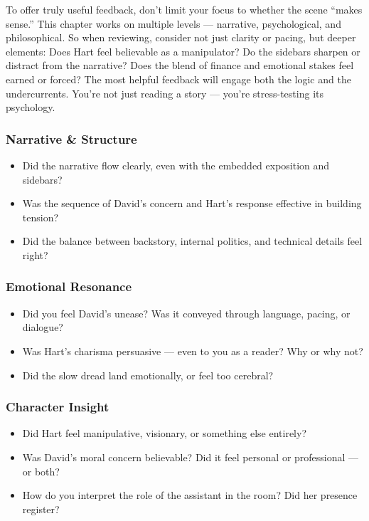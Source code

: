 To offer truly useful feedback, don’t limit your focus to whether the scene “makes sense.” This chapter works on multiple levels 
— narrative, psychological, and philosophical. So when reviewing, consider not just clarity or pacing, but deeper elements: Does 
Hart feel believable as a manipulator? Do the sidebars sharpen or distract from the narrative? Does the blend of finance and 
emotional stakes feel earned or forced? The most helpful feedback will engage both the logic and the undercurrents. You're not 
just reading a story — you're stress-testing its psychology.

\subsubsection{Narrative \& Structure}

\begin{itemize}
  \item Did the narrative flow clearly, even with the embedded exposition and sidebars?
  \item Was the sequence of David's concern and Hart’s response effective in building tension?
  \item Did the balance between backstory, internal politics, and technical details feel right?
\end{itemize}

\subsubsection{Emotional Resonance}

\begin{itemize}
  \item Did you feel David’s unease? Was it conveyed through language, pacing, or dialogue?
  \item Was Hart’s charisma persuasive — even to you as a reader? Why or why not?
  \item Did the slow dread land emotionally, or feel too cerebral?
\end{itemize}

\subsubsection{Character Insight}

\begin{itemize}
  \item Did Hart feel manipulative, visionary, or something else entirely?
  \item Was David’s moral concern believable? Did it feel personal or professional — or both?
  \item How do you interpret the role of the assistant in the room? Did her presence register?
\end{itemize}

